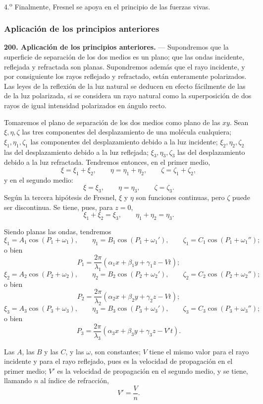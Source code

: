 4.\textsuperscript{o} Finalmente, Fresnel se apoya en el principio de las fuerzas
vivas.

\subsubsection{Aplicación de los principios anteriores}

\noindent\textbf{200. Aplicación de los principios anteriores.} —
Supondremos que la superficie de separación de los dos medios es un plano;
que las ondas incidente, reflejada y refractada son planas. Supondremos
además que el rayo incidente, y por consiguiente los rayos reflejado y
refractado, están enteramente polarizados. Las leyes de la reflexión de la
luz natural se deducen en efecto fácilmente de las de la luz polarizada,
si se considera un rayo natural como la superposición de dos rayos de
igual intensidad polarizados en ángulo recto.

Tomaremos el plano de separación de los dos medios como plano de las
$xy$. Sean $\xi,\eta,\zeta$ las tres componentes del desplazamiento de una
molécula cualquiera; $\xi_1,\eta_1,\zeta_1$ las componentes del
desplazamiento debido a la luz incidente; $\xi_2,\eta_2,\zeta_2$ las del
desplazamiento debido a la luz reflejada; $\xi_3,\eta_3,\zeta_3$ las del
desplazamiento debido a la luz refractada. Tendremos entonces, en el
primer medio,
\[
\xi=\xi_1+\xi_2,\qquad \eta=\eta_1+\eta_2,\qquad \zeta=\zeta_1+\zeta_2,
\]
y en el segundo medio:
\[
\xi=\xi_3,\qquad \eta=\eta_3,\qquad \zeta=\zeta_3.
\]
Según la tercera hipótesis de Fresnel, $\xi$ y $\eta$ son funciones
continuas, pero $\zeta$ puede ser discontinua. Se tiene, pues, para
$z=0$,
\begin{equation}
\xi_1+\xi_2=\xi_3,\qquad \eta_1+\eta_2=\eta_3.
\end{equation}

Siendo planas las ondas, tendremos
\[
\xi_1=A_1\cos(P_1+\omega_1),\qquad \eta_1=B_1\cos(P_1+\omega_1'),\qquad
\zeta_1=C_1\cos(P_1+\omega_1'');
\]
o bien
\[
P_1=\frac{2\pi}{\lambda_1}(\alpha_1x+\beta_1y+\gamma_1z-Vt);
\]
\[
\xi_2=A_2\cos(P_2+\omega_2),\qquad \eta_2=B_2\cos(P_2+\omega_2'),\qquad
\zeta_2=C_2\cos(P_2+\omega_2'');
\]
o bien
\[
P_2=\frac{2\pi}{\lambda_2}(\alpha_2x+\beta_2y+\gamma_2z-Vt);
\]
\[
\xi_3=A_3\cos(P_3+\omega_3),\qquad \eta_3=B_3\cos(P_3+\omega_3'),\qquad
\zeta_3=C_3\cos(P_3+\omega_3'');
\]
o bien
\[
P_3=\frac{2\pi}{\lambda_3}(\alpha_3x+\beta_3y+\gamma_3z-V't).
\]

Las $A$, las $B$ y las $C$, y las $\omega$, son constantes; $V$ tiene el
mismo valor para el rayo incidente y para el rayo reflejado, pues es la
velocidad de propagación en el primer medio; $V'$ es la velocidad de
propagación en el segundo medio, y se tiene, llamando $n$ al índice de
refracción,
\[
V'=\frac{V}{n}.
\]

